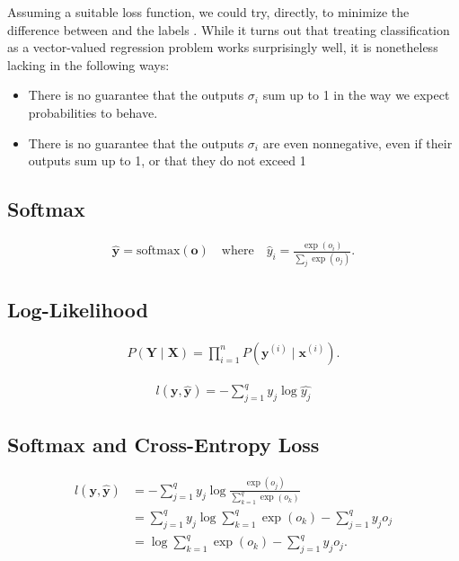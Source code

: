 \documentclass[a4paper,12pt]{article}
\theoremstyle{definition}
\begin{document}
Assuming a suitable loss function, we could try, directly, to minimize the difference between
and the labels
. While it turns out that treating classification as a vector-valued regression problem works surprisingly well, it is nonetheless lacking in the following ways:
\begin{itemize}
    \item There is no guarantee that the outputs $\sigma_i$ sum up to 1 in the way we expect probabilities to behave.
    \item There is no guarantee that the outputs $\sigma_i$ are even nonnegative, even if their outputs sum up to 1, or that they do not exceed 1
\end{itemize}
\subsection*{Softmax}

\begin{align*}
    \hat{\mathbf{y}} = \mathrm{softmax}(\mathbf{o}) \quad \text{where} \quad \hat{y}_i = \frac{\exp(o_i)}{\sum_j \exp(o_j)}.
\end{align*}


\subsection*{Log-Likelihood}

\begin{align*}
    P(\mathbf{Y} \mid \mathbf{X}) = \prod_{i=1}^n P(\mathbf{y}^{(i)} \mid \mathbf{x}^{(i)}).
\end{align*}


\begin{align*}
    l(\mathbf{y},\mathbf{\hat{y}}) = -\sum_{j=1}^{q}y_j \log \hat{y_j}
\end{align*}


\subsection*{Softmax and Cross-Entropy Loss}

\begin{align*}
    l(\mathbf{y}, \hat{\mathbf{y}}) & =  - \sum_{j=1}^q y_j \log \frac{\exp(o_j)}{\sum_{k=1}^q \exp(o_k)}   \\
                                    & = \sum_{j=1}^q y_j \log \sum_{k=1}^q \exp(o_k) - \sum_{j=1}^q y_j o_j \\
                                    & = \log \sum_{k=1}^q \exp(o_k) - \sum_{j=1}^q y_j o_j.
\end{align*}
\end{document}
